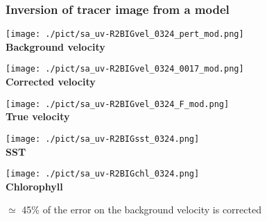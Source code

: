 \documentclass[compress,slidescentered,notes=hide]{beamer}
\begin{document}
\begin{frame}
  \frametitle{Inversion of tracer image from a model}
\begin{minipage}{0.3\textwidth}
\begin{center}
\texttt{[image: ./pict/sa\_uv-R2BIGvel\_0324\_pert\_mod.png]}\\
{\small \bf Background velocity}
\end{center}
\end{minipage}
\begin{minipage}{0.3\textwidth}
\begin{center}
\texttt{[image: ./pict/sa\_uv-R2BIGvel\_0324\_0017\_mod.png]}\\
{\small \bf Corrected velocity}
\end{center}
\end{minipage}
\begin{minipage}{0.3\textwidth}
\begin{center}
\texttt{[image: ./pict/sa\_uv-R2BIGvel\_0324\_F\_mod.png]}\\

{\small \bf True velocity}
\end{center}
\end{minipage}
\begin{minipage}{0.34\textwidth}
\begin{center}
\texttt{[image: ./pict/sa\_uv-R2BIGsst\_0324.png]}\\
{\small \bf SST}
\end{center}
\end{minipage}
\begin{minipage}{0.34\textwidth}
\begin{center}
\texttt{[image: ./pict/sa\_uv-R2BIGchl\_0324.png]}\\
{\small \bf Chlorophyll}
\end{center}
\end{minipage}
\begin{minipage}{0.3\textwidth}
\begin{block}{}
$\simeq$ 45\% of the error on the background velocity is corrected
\end{block}
\end{minipage}

\end{frame}
\end{document}
